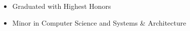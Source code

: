 
\begin{samepage}
\begin{itemize}[noitemsep,topsep=0pt,parsep=0pt,partopsep=0pt]
    \item Graduated with Highest Honors
    \item Minor in Computer Science and Systems \& Architecture
\end{itemize}
\end{samepage}
